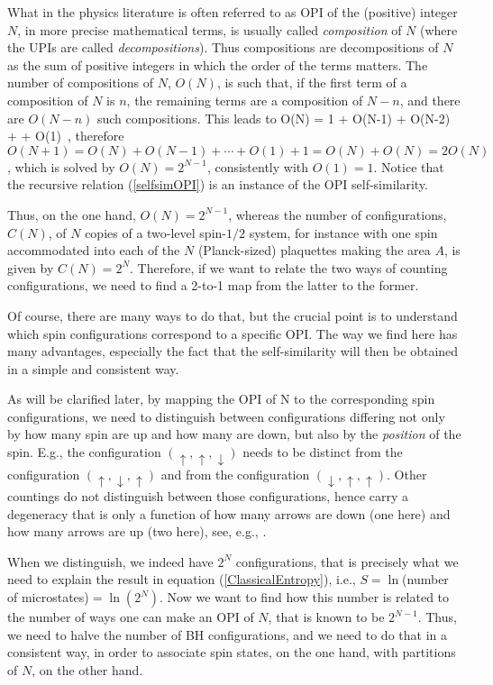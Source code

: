 \documentclass[aps,prd,showkeys,nofootinbib,superscriptaddress]{revtex4-2}
\begin{document}
What in the physics literature is often referred to as OPI of the (positive) integer $N$, in more precise mathematical terms, is usually called \textit{composition} of $N$ (where the UPIs are called \textit{decompositions}). Thus compositions are decompositions of $N$ as the sum of positive integers in which the order of the terms matters. The number of compositions of $N$, $O(N)$, is such that, if the first term of a composition of $N$ is $n$, the remaining terms are a composition of $N - n$, and there are $O(N-n)$ such compositions. This leads to
\be \label{selfsimOPI}
O(N) = 1 + O(N-1) + O(N-2) + \cdots + O(1) \,,
\ee
therefore $O(N+1) = O(N) + O(N-1) + \cdots + O(1) + 1 = O(N) + O(N) = 2 O(N)$, which is solved by $O(N) = 2^{N-1}$, consistently with $O(1)=1$. Notice that the recursive relation (\ref{selfsimOPI}) is an instance of the OPI self-similarity.

Thus, on the one hand, $O(N) = 2^{N - 1}$, whereas the number of configurations, $C(N)$, of $N$ copies of a two-level spin-$1/2$ system, for instance with one spin accommodated into each of the $N$ (Planck-sized) plaquettes making the area $A$, is given by $C(N) = 2^N$. Therefore, if we want to relate the two ways of counting configurations, we need to find a 2-to-1 map from the latter to the former.

Of course, there are many ways to do that, but the crucial point is to understand which spin configurations correspond to a specific OPI. The way we find here has many advantages, especially the fact that the self-similarity will then be obtained in a simple and consistent way.

As will be clarified later, by mapping the OPI of N to the corresponding spin configurations, we need to distinguish between configurations differing not only  by how many spin are up and how many are down, but also by the \textit{position} of the spin. E.g., the configuration $(\uparrow, \uparrow, \downarrow)$ needs to be distinct from the configuration $(\uparrow, \downarrow, \uparrow)$ and from the configuration $(\downarrow, \uparrow, \uparrow)$. Other countings do not distinguish between those configurations, hence carry a degeneracy that is only a function of how many arrows are down (one here) and how many arrows are up (two here), see, e.g., \cite{kiefer}.

When we distinguish, we indeed have $2^N$ configurations, that is precisely what we need to explain the result in equation (\ref{ClassicalEntropy}), i.e., $S = \ln$(number of microstates)$= \ln (2^N)$. Now we want to find how this number is related to the number of ways one can make an OPI of $N$, that is known to be $2^{N-1}$. Thus, we need to halve the number of BH configurations, and we need to do that in a consistent way, in order to associate spin states, on the one hand, with partitions of $N$, on the other hand.
\end{document}
